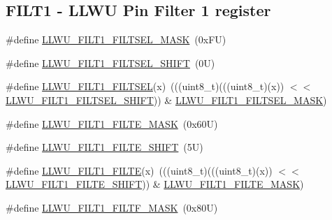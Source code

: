 \subsection*{F\+I\+L\+T1 -\/ L\+L\+WU Pin Filter 1 register}
\begin{DoxyCompactItemize}
\item 
\#define \mbox{\hyperlink{group___l_l_w_u___register___masks_gaa44e21d07f509d1f5d6cec9da32ab8ab}{L\+L\+W\+U\+\_\+\+F\+I\+L\+T1\+\_\+\+F\+I\+L\+T\+S\+E\+L\+\_\+\+M\+A\+SK}}~(0x\+F\+U)
\item 
\#define \mbox{\hyperlink{group___l_l_w_u___register___masks_gaab2a7991b2b135f0557b1b41cc3528f7}{L\+L\+W\+U\+\_\+\+F\+I\+L\+T1\+\_\+\+F\+I\+L\+T\+S\+E\+L\+\_\+\+S\+H\+I\+FT}}~(0\+U)
\item 
\#define \mbox{\hyperlink{group___l_l_w_u___register___masks_ga9d7876a517542c2fa363b9f15d375d69}{L\+L\+W\+U\+\_\+\+F\+I\+L\+T1\+\_\+\+F\+I\+L\+T\+S\+EL}}(x)~(((uint8\+\_\+t)(((uint8\+\_\+t)(x)) $<$$<$ \mbox{\hyperlink{group___l_l_w_u___register___masks_gaab2a7991b2b135f0557b1b41cc3528f7}{L\+L\+W\+U\+\_\+\+F\+I\+L\+T1\+\_\+\+F\+I\+L\+T\+S\+E\+L\+\_\+\+S\+H\+I\+FT}})) \& \mbox{\hyperlink{group___l_l_w_u___register___masks_gaa44e21d07f509d1f5d6cec9da32ab8ab}{L\+L\+W\+U\+\_\+\+F\+I\+L\+T1\+\_\+\+F\+I\+L\+T\+S\+E\+L\+\_\+\+M\+A\+SK}})
\item 
\#define \mbox{\hyperlink{group___l_l_w_u___register___masks_gae449f984f9cfeec99ab8380e356b57c7}{L\+L\+W\+U\+\_\+\+F\+I\+L\+T1\+\_\+\+F\+I\+L\+T\+E\+\_\+\+M\+A\+SK}}~(0x60\+U)
\item 
\#define \mbox{\hyperlink{group___l_l_w_u___register___masks_ga0d4b7527c910e60bdf1f52e51b1c0932}{L\+L\+W\+U\+\_\+\+F\+I\+L\+T1\+\_\+\+F\+I\+L\+T\+E\+\_\+\+S\+H\+I\+FT}}~(5\+U)
\item 
\#define \mbox{\hyperlink{group___l_l_w_u___register___masks_ga2eb83c2856ca0d1d7ff09384809aed2f}{L\+L\+W\+U\+\_\+\+F\+I\+L\+T1\+\_\+\+F\+I\+L\+TE}}(x)~(((uint8\+\_\+t)(((uint8\+\_\+t)(x)) $<$$<$ \mbox{\hyperlink{group___l_l_w_u___register___masks_ga0d4b7527c910e60bdf1f52e51b1c0932}{L\+L\+W\+U\+\_\+\+F\+I\+L\+T1\+\_\+\+F\+I\+L\+T\+E\+\_\+\+S\+H\+I\+FT}})) \& \mbox{\hyperlink{group___l_l_w_u___register___masks_gae449f984f9cfeec99ab8380e356b57c7}{L\+L\+W\+U\+\_\+\+F\+I\+L\+T1\+\_\+\+F\+I\+L\+T\+E\+\_\+\+M\+A\+SK}})
\item 
\#define \mbox{\hyperlink{group___l_l_w_u___register___masks_gabdb5ca902522996074a75ed08a7a8b03}{L\+L\+W\+U\+\_\+\+F\+I\+L\+T1\+\_\+\+F\+I\+L\+T\+F\+\_\+\+M\+A\+SK}}~(0x80\+U)
\item 

\end{DoxyCompactItemize}
